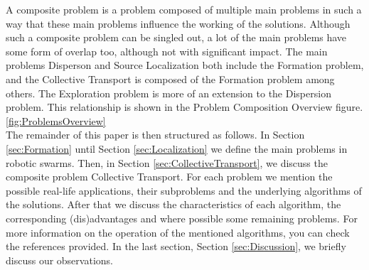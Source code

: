 A composite problem is a problem composed of multiple main problems in such a way that these main problems influence the working of the solutions. 
Although such a composite problem can be singled out, a lot of the main problems have some form of overlap too, although not with significant impact. 
The main problems Disperson and Source Localization both include the Formation problem, and the Collective Transport is composed of the Formation problem among others.
The Exploration problem is more of an extension to the Dispersion problem. 
This relationship is shown in the Problem Composition Overview figure. \ref{fig:ProblemsOverview} \\


The remainder of this paper is then structured as follows. 
In Section \ref{sec:Formation} until Section \ref{sec:Localization} we define the main problems in robotic swarms. 
Then, in Section \ref{sec:CollectiveTransport}, we discuss the composite problem Collective Transport. 
For each problem we mention the possible real-life applications, their subproblems and the underlying algorithms of the solutions.
After that we discuss the characteristics of each algorithm, the corresponding (dis)advantages and where possible some remaining problems.
For more information on the operation of the mentioned algorithms, you can check the references provided. 
In the last section, Section \ref{sec:Discussion}, we briefly discuss our observations.



